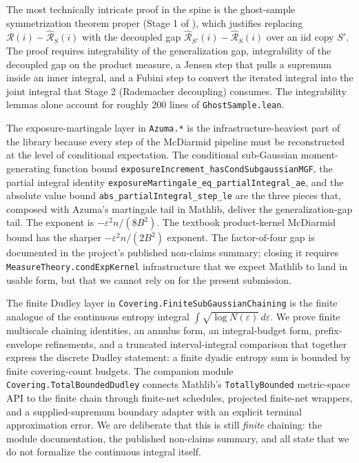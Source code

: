 \documentclass[sigplan,anonymous,review,screen]{acmart}
\newcommand{\Risk}{\mathcal{R}}
\newcommand{\eRisk}{\widehat{\mathcal{R}}}
\begin{document}
The most technically intricate proof in the spine is the ghost-sample
symmetrization theorem proper (Stage 1 of
), which justifies replacing
$\Risk(i) - \eRisk_S(i)$ with the decoupled gap
$\eRisk_{S'}(i) - \eRisk_S(i)$ over an iid copy $S'$. The proof requires
integrability of the generalization gap, integrability of the decoupled
gap on the product measure, a Jensen step that pulls a supremum inside
an inner integral, and a Fubini step to convert the iterated integral
into the joint integral that Stage 2 (Rademacher decoupling) consumes.
The integrability lemmas alone account for roughly 200 lines of
\texttt{GhostSample.lean}.

The exposure-martingale layer in \texttt{Azuma.*} is the
infrastructure-heaviest part of the library because every step of the
McDiarmid pipeline must be reconstructed at the level of conditional
expectation. The conditional sub-Gaussian moment-generating function
bound \texttt{exposureIncrement\_hasCondSubgaussianMGF}, the partial
integral identity
\texttt{exposureMartingale\_eq\_}\allowbreak\texttt{partialIntegral\_ae}, and the absolute
value bound \texttt{abs\_partialIntegral\_step\_le} are the three pieces
that, composed with Azuma's martingale tail in Mathlib, deliver the
generalization-gap tail. The exponent is $-\varepsilon^2 n / (8 B^2)$.
The textbook product-kernel McDiarmid bound has the sharper $-\varepsilon^2
n / (2 B^2)$ exponent. The factor-of-four gap is documented in the
project's published non-claims summary; closing it requires
\texttt{MeasureTheory.condExpKernel} infrastructure that we expect
Mathlib to land in usable form, but that we cannot rely on for the
present submission.

The finite Dudley layer in \texttt{Covering.\allowbreak{}Finite\allowbreak{}SubGaussianChaining}
is the finite analogue of the continuous entropy integral
$\int \sqrt{\log N(\varepsilon)}\,d\varepsilon$. We prove finite multiscale chaining identities, an
annulus form, an integral-budget form, prefix-envelope refinements, and a
truncated interval-integral comparison that together express the discrete
Dudley statement: a finite dyadic entropy sum is bounded by finite
covering-count budgets. The companion module \texttt{Covering.TotalBoundedDudley}
connects Mathlib's \texttt{TotallyBounded} metric-space API to the finite
chain through finite-net schedules, projected finite-net wrappers, and a
supplied-supremum boundary adapter with an explicit terminal approximation
error. We are deliberate that this is still \emph{finite} chaining: the
module documentation, the published non-claims summary, and
 all state that we do not formalize the continuous integral
itself.
\end{document}
